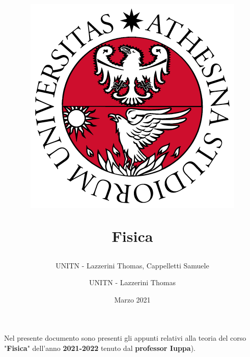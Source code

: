\documentclass[12pt]{article}
\title{
    \begin{figure}[ht!]
        \centering
        \includegraphics[width=.5\textwidth]{LOGO}
        \label{fig:logo unitn}
    \end{figure}
    \bigskip
    Fisica
}
\author{UNITN - Lazzerini Thomas, Cappelletti Samuele}
\date{Marzo 2021}
\author{UNITN - Lazzerini Thomas}
\begin{document}
    \maketitle
    \vfill

    \begin{center}
        Nel presente documento sono presenti gli appunti relativi alla teoria del corso "\textbf{Fisica}" dell'anno \textbf{2021-2022} tenuto dal \textbf{professor Iuppa}).\\
    \end{center}

    \newpage

    \tableofcontents

    \newpage

	
	
	
	
\end{document}

